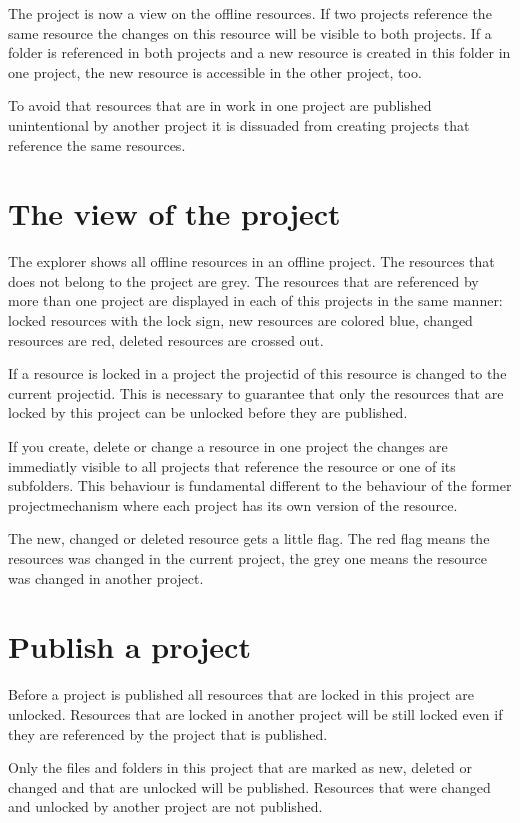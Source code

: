 The project is now a view on the offline resources. If two
projects reference the same resource the changes on this resource
will be visible to both projects. If a folder is referenced in
both projects and a new resource is created in this folder in one
project, the new resource is accessible in the other project, too.

To avoid that resources that are in work in one project are
published unintentional by another project it is dissuaded from
creating projects that reference the same resources.

\section{The view of the project}

The explorer shows all offline resources in an offline project.
The resources that does not belong to the project are grey. The
resources that are referenced by more than one project are
displayed in each of this projects in the same manner: locked
resources with the lock sign, new resources are colored blue,
changed resources are red, deleted resources are crossed out.

If a resource is locked in a project the projectid of this
resource is changed to the current projectid. This is necessary to
guarantee that only the resources that are locked by this project
can be unlocked before they are published.

If you create, delete or change a resource in one project the
changes are immediatly visible to all projects that reference the
resource or one of its subfolders. This behaviour is fundamental
different to the behaviour of the former projectmechanism where
each project has its own version of the resource.

The new, changed or deleted resource gets a little flag. The red
flag means the resources was changed in the current project, the
grey one means the resource was changed in another project.

\section{Publish a project}

Before a project is published all resources that are locked in
this project are unlocked. Resources that are locked in another
project will be still locked even if they are referenced by the
project that is published.

Only the files and folders in this project that are marked as new,
deleted or changed and that are unlocked will be published.
Resources that were changed and unlocked by another project are
not published.


